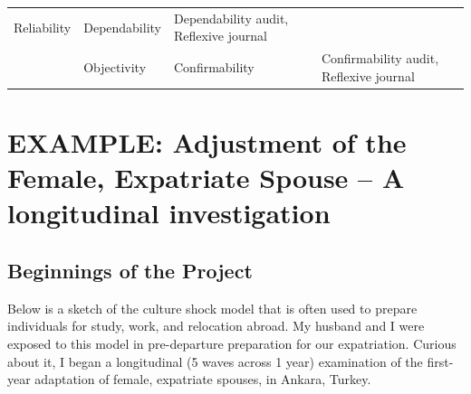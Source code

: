 \documentclass[
  english,
]{book}
\begin{document}
\begin{longtable}[]{@{}llll@{}}
\begin{minipage}[t]{0.21\columnwidth}
Reliability\strut
\end{minipage} & \begin{minipage}[t]{0.21\columnwidth}\raggedright
Dependability\strut
\end{minipage} & \begin{minipage}[t]{0.33\columnwidth}\raggedright
Dependability audit, Reflexive journal\strut
\end{minipage}\tabularnewline
\begin{minipage}[t]{0.14\columnwidth}\raggedright
\strut
\end{minipage} & \begin{minipage}[t]{0.21\columnwidth}\raggedright
Objectivity\strut
\end{minipage} & \begin{minipage}[t]{0.21\columnwidth}\raggedright
Confirmability\strut
\end{minipage} & \begin{minipage}[t]{0.33\columnwidth}\raggedright
Confirmability audit, Reflexive journal\strut
\end{minipage}\tabularnewline
\bottomrule
\end{longtable}

\hypertarget{example-adjustment-of-the-female-expatriate-spouse-a-longitudinal-investigation-bikos_repeated_2007}{%
\section{\texorpdfstring{EXAMPLE: Adjustment of the Female, Expatriate Spouse -- A longitudinal investigation \citep{bikos_repeated_2007}}{EXAMPLE: Adjustment of the Female, Expatriate Spouse -- A longitudinal investigation {[}@bikos\_repeated\_2007{]}}}\label{example-adjustment-of-the-female-expatriate-spouse-a-longitudinal-investigation-bikos_repeated_2007}}

\hypertarget{beginnings-of-the-project}{%
\subsection{Beginnings of the Project}\label{beginnings-of-the-project}}

Below is a sketch of the culture shock model that is often used to prepare individuals for study, work, and relocation abroad. My husband and I were exposed to this model in pre-departure preparation for our expatriation. Curious about it, I began a longitudinal (5 waves across 1 year) examination of the first-year adaptation of female, expatriate spouses, in Ankara, Turkey.
\end{document}
